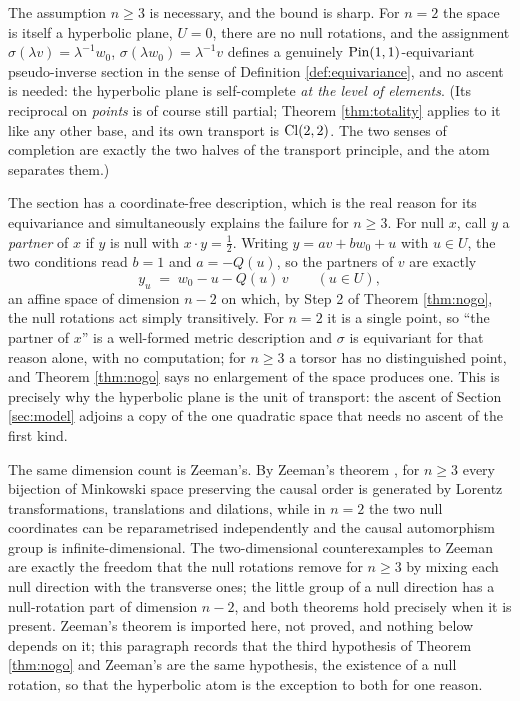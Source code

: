 \begin{remark}\label{rem:atom}
The assumption $n \geq 3$ is necessary, and the bound is sharp. For $n = 2$ the space is itself a hyperbolic plane, $U = 0$, there are no null rotations, and the assignment $\sigma(\lambda v) = \lambda^{-1} w_0$, $\sigma(\lambda w_0) = \lambda^{-1} v$ defines a genuinely $\mathrm{Pin}(1,1)$-equivariant pseudo-inverse section in the sense of Definition \ref{def:equivariance}, and no ascent is needed: the hyperbolic plane is self-complete \emph{at the level of elements}. (Its reciprocal on \emph{points} is of course still partial; Theorem \ref{thm:totality} applies to it like any other base, and its own transport is $\mathrm{Cl}(2,2)$. The two senses of completion are exactly the two halves of the transport principle, and the atom separates them.)

The section has a coordinate-free description, which is the real reason for its equivariance and simultaneously explains the failure for $n \geq 3$. For null $x$, call $y$ a \emph{partner} of $x$ if $y$ is null with $x \cdot y = \tfrac12$. Writing $y = av + bw_0 + u$ with $u \in U$, the two conditions read $b = 1$ and $a = -Q(u)$, so the partners of $v$ are exactly
\begin{equation}\label{eq:partners}
y_u \;=\; w_0 - u - Q(u)\,v \qquad (u \in U),
\end{equation}
an affine space of dimension $n - 2$ on which, by Step 2 of Theorem \ref{thm:nogo}, the null rotations act simply transitively. For $n = 2$ it is a single point, so ``the partner of $x$'' is a well-formed metric description and $\sigma$ is equivariant for that reason alone, with no computation; for $n \geq 3$ a torsor has no distinguished point, and Theorem \ref{thm:nogo} says no enlargement of the space produces one. This is precisely why the hyperbolic plane is the unit of transport: the ascent of Section \ref{sec:model} adjoins a copy of the one quadratic space that needs no ascent of the first kind.


The same dimension count is Zeeman's. By Zeeman's theorem \cite{Zeeman1964}, for $n \geq 3$ every bijection of Minkowski space preserving the causal order is generated by Lorentz transformations, translations and dilations, while in $n = 2$ the two null coordinates can be reparametrised independently and the causal automorphism group is infinite-dimensional. The two-dimensional counterexamples to Zeeman are exactly the freedom that the null rotations remove for $n \geq 3$ by mixing each null direction with the transverse ones; the little group of a null direction has a null-rotation part of dimension $n - 2$, and both theorems hold precisely when it is present. Zeeman's theorem is imported here, not proved, and nothing below depends on it; this paragraph records that the third hypothesis of Theorem \ref{thm:nogo} and Zeeman's are the same hypothesis, the existence of a null rotation, so that the hyperbolic atom is the exception to both for one reason.
\end{remark}

